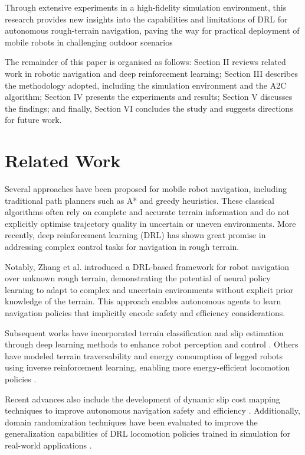 \documentclass[conference]{IEEEtran}
\begin{document}
Through extensive experiments in a high-fidelity simulation environment, this research provides new insights into the capabilities and limitations of DRL for autonomous rough-terrain navigation, paving the way for practical deployment of mobile robots in challenging outdoor scenarios

The remainder of this paper is organised as follows: Section II reviews related work in robotic navigation and deep reinforcement learning; Section III describes the methodology adopted, including the simulation environment and the A2C algorithm; Section IV presents the experiments and results; Section V discusses the findings; and finally, Section VI concludes the study and suggests directions for future work.

\section{Related Work}

Several approaches have been proposed for mobile robot navigation, including traditional path planners such as A* and greedy heuristics. These classical algorithms often rely on complete and accurate terrain information and do not explicitly optimise trajectory quality in uncertain or uneven environments. More recently, deep reinforcement learning (DRL) has shown great promise in addressing complex control tasks for navigation in rough terrain.

Notably, Zhang et al. \cite{Zhang2018DRL} introduced a DRL-based framework for robot navigation over unknown rough terrain, demonstrating the potential of neural policy learning to adapt to complex and uncertain environments without explicit prior knowledge of the terrain. This approach enables autonomous agents to learn navigation policies that implicitly encode safety and efficiency considerations.

Subsequent works have incorporated terrain classification and slip estimation through deep learning methods to enhance robot perception and control \cite{gonzalez2018deepterramechanics}. Others have modeled terrain traversability and energy consumption of legged robots using inverse reinforcement learning, enabling more energy-efficient locomotion policies \cite{gan2022energy}.

Recent advances also include the development of dynamic slip cost mapping techniques to improve autonomous navigation safety and efficiency \cite{slipnet2024}. Additionally, domain randomization techniques have been evaluated to improve the generalization capabilities of DRL locomotion policies trained in simulation for real-world applications \cite{mdpi2022randomization}.
\end{document}
